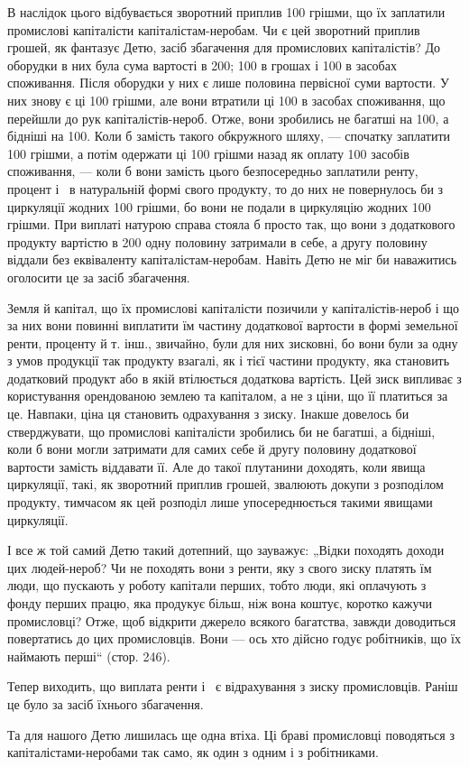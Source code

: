 
В наслідок цього відбувається зворотний приплив 100 грішми, що їх заплатили промислові
капіталісти капіталістам-неробам. Чи є цей зворотний приплив грошей, як фантазує Детю, засіб
збагачення для промислових капіталістів? До оборудки в них була сума вартості в 200; 100 в грошах і 100 в засобах споживання. Після оборудки у них є лише половина
первісної суми вартости. У них знову є ці 100 грішми, але вони втратили ці 100 в
засобах споживання, що перейшли до рук капіталістів-нероб. Отже, вони зробились не багатші на 100, а бідніші на 100. Коли б замість такого обкружного шляху, — спочатку заплатити 100 грішми, а потім одержати ці 100 грішми назад як оплату 100 засобів
споживання, — коли б вони замість цього безпосередньо заплатили ренту, процент і~ в
натуральній формі свого продукту, то до них не повернулось би з циркуляції жодних 100
грішми, бо вони не подали в циркуляцію жодних 100 грішми. При виплаті натурою справа
стояла б просто так, що вони з додаткового продукту вартістю в 200 одну половину затримали
в себе, а другу половину віддали без еквіваленту капіталістам-неробам. Навіть Детю не міг би
наважитись оголосити це за засіб збагачення.

Земля й капітал, що їх промислові капіталісти позичили у капіталістів-нероб і що за них вони повинні
виплатити їм частину додаткової вартости в формі земельної ренти, проценту й т. інш., звичайно, були
для них зисковні, бо вони були за одну з умов продукції так продукту взагалі, як і тієї частини
продукту, яка становить додатковий продукт або в якій втілюється додаткова вартість. Цей зиск
випливає з користування орендованою землею та капіталом, а не з ціни, що її платиться за це.
Навпаки, ціна ця становить одрахування з зиску. Інакше довелось би стверджувати, що промислові
капіталісти зробились би не багатші, а бідніші, коли б вони могли затримати для самих себе й другу
половину додаткової вартости замість віддавати її. Але до такої плутанини доходять, коли явища
циркуляції, такі, як зворотний приплив грошей, звалюють докупи з розподілом продукту, тимчасом як
цей розподіл лише упосереднюється такими явищами циркуляції.

І все ж той самий Детю такий дотепний, що зауважує: „Відки походять доходи цих людей-нероб? Чи не
походять вони з ренти, яку з свого зиску платять їм люди, що пускають у роботу капітали перших,
тобто люди, які оплачують з фонду перших працю, яка продукує більш, ніж вона коштує, коротко кажучи
промисловці? Отже, щоб відкрити джерело всякого багатства, завжди доводиться повертатись до цих
промисловців. Вони — ось хто дійсно годує робітників, що їх наймають перші“ (стор. 246).

Тепер виходить, що виплата ренти і~ є відрахування з зиску промисловців. Раніш це було за
засіб їхнього збагачення.

Та для нашого Детю лишилась ще одна втіха. Ці браві промисловці поводяться з капіталістами-неробами
так само, як один з одним і з робітниками.
\parbreak{}  %
